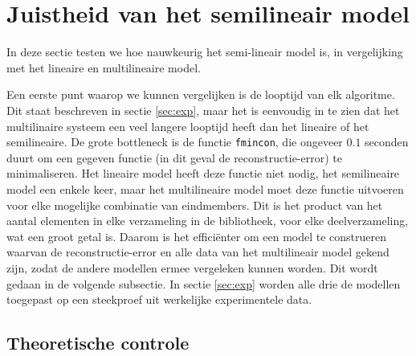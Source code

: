 \documentclass[12pt]{report}
\begin{document}
\section{Juistheid van het semilineair model}

In deze sectie testen we hoe nauwkeurig het semi-lineair model is, in vergelijking met het lineaire en multilineaire model.

Een eerste punt waarop we kunnen vergelijken is de looptijd van elk algoritme. Dit staat beschreven in sectie \ref{sec:exp}, maar het is eenvoudig in te zien dat het multilinaire systeem een veel langere looptijd heeft dan het lineaire of het semilineaire. De grote bottleneck is de functie \texttt{fmincon}, die ongeveer $0.1$ seconden duurt om een gegeven functie (in dit geval de reconstructie-error) te minimaliseren. Het lineaire model heeft deze functie niet nodig, het semilineaire model een enkele keer, maar het multilineaire model moet deze functie uitvoeren voor elke mogelijke combinatie van eindmembers. Dit is het product van het aantal elementen in elke verzameling in de bibliotheek, voor elke deelverzameling, wat een groot getal is. Daarom is het effici\"enter om een model te construeren waarvan de reconstructie-error en alle data van het multilineair model gekend zijn, zodat de andere modellen ermee vergeleken kunnen worden. Dit wordt gedaan in de volgende subsectie. In sectie \ref{sec:exp} worden alle drie de modellen toegepast op een steekproef uit werkelijke experimentele data.

\subsection{Theoretische controle}
\end{document}

